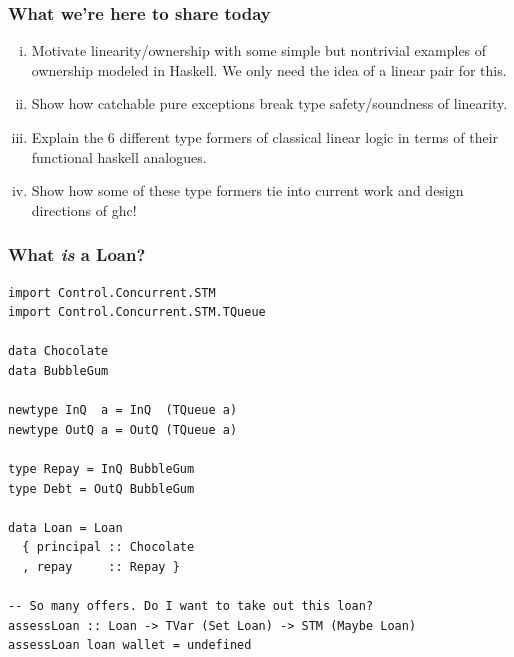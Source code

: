 \documentclass[11pt,reqno]{beamer}
\begin{document}
\begin{frame}\frametitle{What we're here to share today}
  \begin{enumerate}[(i)]
    \item Motivate linearity/ownership with some simple but nontrivial examples of ownership modeled
    in Haskell. We only need the idea of a linear pair for this.
    \item Show how catchable pure exceptions break type safety/soundness of linearity.
    \item Explain the 6 different type formers of classical linear logic in terms of
    their functional haskell analogues.
    \item Show how some of these type formers tie into current work and design directions
    of ghc!
  \end{enumerate}
\end{frame}













\begin{frame}[fragile]
\frametitle{What \emph{is} a Loan?}

\begin{verbatim}
import Control.Concurrent.STM
import Control.Concurrent.STM.TQueue

data Chocolate
data BubbleGum

newtype InQ  a = InQ  (TQueue a)
newtype OutQ a = OutQ (TQueue a)

type Repay = InQ BubbleGum
type Debt = OutQ BubbleGum

data Loan = Loan
  { principal :: Chocolate
  , repay     :: Repay }

-- So many offers. Do I want to take out this loan?
assessLoan :: Loan -> TVar (Set Loan) -> STM (Maybe Loan)
assessLoan loan wallet = undefined
\end{verbatim}
\end{frame}

\end{document}
